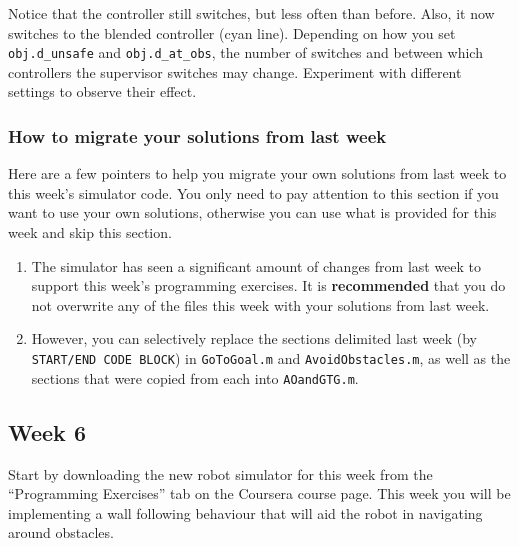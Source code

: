 \documentclass[10pt]{article}
\begin{document}
\begin{enumerate}
  Notice that the controller still switches, but less often than before. Also, it now switches to the blended controller (cyan line). Depending on how you set \texttt{obj.d\_unsafe} and \texttt{obj.d\_at\_obs}, the number of switches and between which controllers the supervisor switches may change. Experiment with different settings to observe their effect.
    
\end{enumerate}

\subsubsection*{How to migrate your solutions from last week}
Here are a few pointers to help you migrate your own solutions from last week to this week's simulator code. You only need to pay attention to this section if you want to use your own solutions, otherwise you can use what is provided for this week and skip this section.

\begin{enumerate}
 \item The simulator has seen a significant amount of changes from last week to support this week's programming exercises. It is \textbf{recommended} that you do not overwrite any of the files this week with your solutions from last week.
 \item However, you can selectively replace the sections delimited last week (by \texttt{START/END CODE BLOCK}) in \texttt{GoToGoal.m} and \texttt{AvoidObstacles.m}, as well as the sections that were copied from each into \texttt{AOandGTG.m}.
\end{enumerate}

\subsection{Week 6}

Start by downloading the new robot simulator for this week from the ``Programming Exercises'' tab on the Coursera course page. This week you will be implementing a wall following behaviour that will aid the robot in navigating around obstacles.
\end{document}
